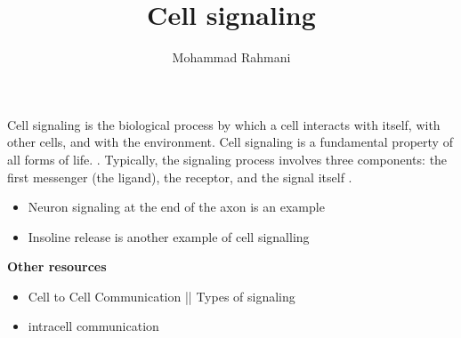 \documentclass[a4paper]{article}
\title{Cell signaling}
\date{}
\author{Mohammad Rahmani}
\begin{document}
    \maketitle
    Cell signaling is the biological process by which a cell interacts with itself, with other cells, and with the environment. Cell signaling is a fundamental property of all forms of life. . Typically, the signaling process involves three components: the first messenger (the ligand), the receptor, and the signal itself .
    
    \begin{itemize}
        \item Neuron signaling at the end of the axon is an example
        \item Insoline release is another example of cell signalling
    \end{itemize}
    
    \textbf{Other resources}
    \begin{itemize}
        \item Cell to Cell Communication || Types of signaling 
        \item intracell communication 
    \end{itemize}
    
    
    
\end{document}
